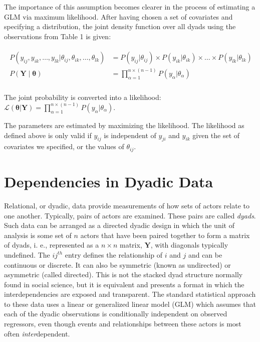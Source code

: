 \documentclass[12pt]{amsart}
\begin{document}
The importance of this assumption becomes clearer in the process of estimating a GLM via maximum likelihood. After having chosen a set of covariates and specifying a distribution, the joint density function over all dyads using the observations from Table 1 is given:

\vspace{-8mm}
\begin{align}
\begin{aligned}
	P(y_{ij}, y_{ik}, \ldots, y_{lk} | \theta_{ij}, \theta_{ik}, \ldots, \theta_{lk}) &= P(y_{ij} | \theta_{ij}) \times P(y_{ik} | \theta_{ik}) \times \ldots \times P(y_{lk} | \theta_{lk}) \\
	P(\mathbf{Y} \; | \; \bm{\theta}) &= \prod_{\alpha=1}^{n \times (n-1)} P(y_{\alpha} | \theta_{\alpha})  \\
\end{aligned}
\end{align}

\noindent The joint probability is converted into a likelihood: $\displaystyle \mathcal{L} (\bm{\theta} | \mathbf{Y}) = \prod_{\alpha=1}^{n \times (n-1)} P(y_{\alpha} | \theta_{\alpha})$.

The parameters are estimated by maximizing the likelihood. The likelihood as defined above is only valid if  $y_{ij}$ is independent of $y_{ji}$ and $y_{ik}$ given the set of covariates we specified, or the values of $\theta_{ij}$.

\section{\textbf{Dependencies in Dyadic Data}}

Relational, or dyadic, data provide measurements of how sets of actors relate to one another. Typically, pairs of actors are examined. These pairs are called \textit{dyads}. Such data can be arranged as a directed dyadic design in which the unit of analysis is some set of $n$ actors that have been paired together to form a matrix of dyads, i. e., represented as a $n \times n$ matrix, $\mathbf{Y}$, with diagonals typically undefined. The $ij^{th}$ entry defines the relationship of $i$ and $j$ and can be continuous or discrete. It can also be symmetric (known as undirected) or asymmetric (called directed). This is not the stacked dyad structure normally found in social science, but it is equivalent and presents a format in which the interdependencies are exposed and transparent. The standard statistical approach to these data uses a linear or generalized linear model (GLM) which assumes that each of the dyadic observations is conditionally independent on observed regressors, even though events and relationships between these actors is most often \textit{inter}dependent. 
\end{document}
